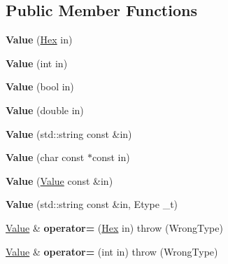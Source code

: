 \subsection*{Public Member Functions}
\begin{DoxyCompactItemize}
\item 
\hypertarget{classValue_ae571dc87a1b3aa28b77ad1c71806fac3}{{\bfseries Value} (\hyperlink{classHex}{Hex} in)}\label{classValue_ae571dc87a1b3aa28b77ad1c71806fac3}

\item 
\hypertarget{classValue_a51dc47b1234df29a55e5b9464197f92a}{{\bfseries Value} (int in)}\label{classValue_a51dc47b1234df29a55e5b9464197f92a}

\item 
\hypertarget{classValue_ade711e44b478c4642e0c67740fbeb0d1}{{\bfseries Value} (bool in)}\label{classValue_ade711e44b478c4642e0c67740fbeb0d1}

\item 
\hypertarget{classValue_a9bff44d96e7c5338429836a88e17523e}{{\bfseries Value} (double in)}\label{classValue_a9bff44d96e7c5338429836a88e17523e}

\item 
\hypertarget{classValue_aea5dab0eef83bbb3e5b0389bbeddaa49}{{\bfseries Value} (std\-::string const \&in)}\label{classValue_aea5dab0eef83bbb3e5b0389bbeddaa49}

\item 
\hypertarget{classValue_a325758ee5a8490e7998707e69c9dbf1c}{{\bfseries Value} (char const $\ast$const in)}\label{classValue_a325758ee5a8490e7998707e69c9dbf1c}

\item 
\hypertarget{classValue_a84847a7572266a87736adfd9593889a8}{{\bfseries Value} (\hyperlink{classValue}{Value} const \&in)}\label{classValue_a84847a7572266a87736adfd9593889a8}

\item 
\hypertarget{classValue_aa1d9738269561a6222d62bf93dffff4f}{{\bfseries Value} (std\-::string const \&in, Etype \-\_\-t)}\label{classValue_aa1d9738269561a6222d62bf93dffff4f}

\item 
\hypertarget{classValue_aa5cfc92aa1824df25992ca212c105b9d}{\hyperlink{classValue}{Value} \& {\bfseries operator=} (\hyperlink{classHex}{Hex} in)  throw (\-Wrong\-Type)}\label{classValue_aa5cfc92aa1824df25992ca212c105b9d}

\item 
\hypertarget{classValue_aa0c9cfd5e17ac6df6763cf00f83c695c}{\hyperlink{classValue}{Value} \& {\bfseries operator=} (int in)  throw (\-Wrong\-Type)}\label{classValue_aa0c9cfd5e17ac6df6763cf00f83c695c}


\end{DoxyCompactItemize}
